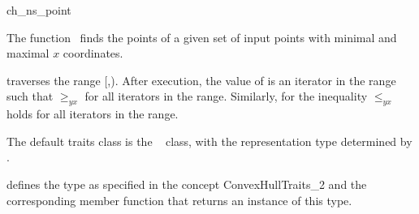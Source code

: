 

\begin{ccRefFunction}{ch_ns_point}  %

\ccDefinition
  
The function \ccRefName\ finds the points of a given set  
of input points with minimal and maximal $x$ coordinates.


           {traverses the range [,).
            After execution, the value of
             is an iterator in the range such that  $\ge_{yx}$
             for all iterators  in the range. Similarly, for
             the inequality  $\le_{yx}$ 
            holds for all iterators in the range.}

The default traits class  is the \cgal\ 
 class,
with the representation type determined by .


 defines the type  as specified in
the concept ConvexHullTraits\_2 and the corresponding member
function that returns an instance of this type.


\ccSeeAlso

 \\
 \\
 \\
 \\
 \\

\end{ccRefFunction}


